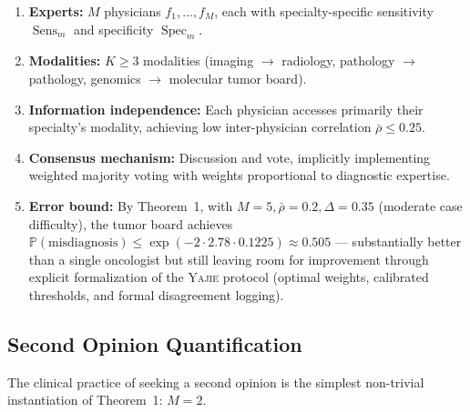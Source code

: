 \documentclass[11pt,a4paper]{article}
\theoremstyle{definition}
\newcommand{\Yajie}{\textsc{Yajie}}
\DeclareMathOperator{\Sens}{Sens}
\DeclareMathOperator{\Spec}{Spec}
\newcommand{\Pbb}{\mathbb{P}}
\begin{document}
\begin{enumerate}[nosep]
    \item \textbf{Experts:} $M$ physicians $f_1, \dots, f_M$, each with
    specialty-specific sensitivity $\Sens_m$ and specificity $\Spec_m$.
    \item \textbf{Modalities:} $K \ge 3$ modalities (imaging $\to$ radiology,
    pathology $\to$ pathology, genomics $\to$ molecular tumor board).
    \item \textbf{Information independence:} Each physician accesses primarily
    their specialty's modality, achieving low inter-physician correlation
    $\bar{\rho} \le 0.25$.
    \item \textbf{Consensus mechanism:} Discussion and vote, implicitly
    implementing weighted majority voting with weights proportional to
    diagnostic expertise.
    \item \textbf{Error bound:} By Theorem~1, with $M=5, \bar{\rho}=0.2,
    \Delta=0.35$ (moderate case difficulty), the tumor board achieves
    $\Pbb(\text{misdiagnosis}) \le \exp(-2 \cdot 2.78 \cdot 0.1225) \approx 0.505$ ---
    substantially better than a single oncologist but still leaving room
    for improvement through explicit formalization of the \Yajie{} protocol
    (optimal weights, calibrated thresholds, and formal disagreement logging).
\end{enumerate}

\subsection{Second Opinion Quantification}

The clinical practice of seeking a second opinion is the simplest
non-trivial instantiation of Theorem~1: $M = 2$.
\end{document}
